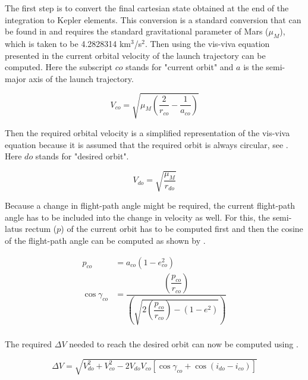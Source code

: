 \noindent
The first step is to convert the final cartesian state obtained at the end of the integration to Kepler elements. This conversion is a standard conversion that can be found in \cite{wakker2010} and requires the standard gravitational parameter of Mars ($\mu_{M}$), which is taken to be 4.2828314 km$^{3}$/s$^{2}$. Then using the vis-viva equation presented in  the current orbital velocity of the launch trajectory can be computed. Here the subscript $co$ stands for "current orbit" and $a$ is the semi-major axis of the launch trajectory.

\begin{equation} \label{eq:visViva}
V_{co} = \sqrt{\mu_{M}\left(\dfrac{2}{r_{co}}-\dfrac{1}{a_{co}}\right)}
\end{equation}


\noindent
Then the required orbital velocity is a simplified representation of the vis-viva equation because it is assumed that the required orbit is always circular, see . Here $do$ stands for "desired orbit".

\begin{equation} \label{eq:simpVisViva}
V_{do}=\sqrt{\dfrac{\mu_{M}}{r_{do}}}
\end{equation} 

\noindent
Because a change in flight-path angle might be required, the current flight-path angle has to be included into the change in velocity as well. For this, the semi-latus rectum ($p$) of the current orbit has to be computed first and then the cosine of the flight-path angle can be computed as shown by .


\begin{equation}\label{eq:cosFPA}
\begin{split}
p_{co}&=a_{co}\left(1-e_{co}^{2}\right)\\
\cos \gamma_{co}&=\dfrac{\left(\dfrac{p_{co}}{r_{co}}\right)}{\left(\sqrt{2\left(\dfrac{p_{co}}{r_{co}}\right)-\left(1-e^{2}\right)}\right)}\\
\end{split}
\end{equation}

\noindent
The required $\Delta V$ needed to reach the desired orbit can now be computed using .

\begin{equation} \label{eq:requiredDeltaV}
\Delta V = \sqrt{V_{do}^{2}+V_{co}^{2}-2V_{do}V_{co}\left[\cos \gamma_{co}+\cos\left(i_{do}-i_{co}\right)\right]}
\end{equation}

